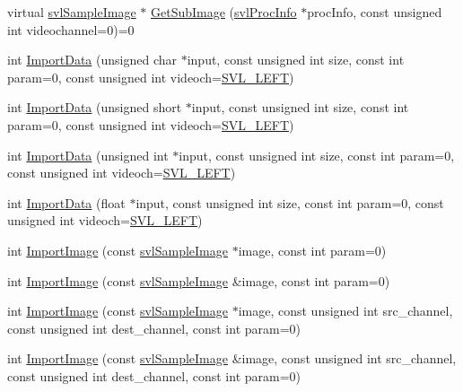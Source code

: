 \begin{DoxyCompactItemize}
\item 
virtual \hyperlink{classsvl_sample_image}{svl\-Sample\-Image} $\ast$ \hyperlink{classsvl_sample_image_a034171461bca11c13606f03abbf526a3}{Get\-Sub\-Image} (\hyperlink{structsvl_proc_info}{svl\-Proc\-Info} $\ast$proc\-Info, const unsigned int videochannel=0)=0
\item 
int \hyperlink{classsvl_sample_image_aef0e73b0e5906d4b60e689f41ff49a48}{Import\-Data} (unsigned char $\ast$input, const unsigned int size, const int param=0, const unsigned int videoch=\hyperlink{svl_definitions_8h_ab9fec7615f19c8df2919eebcab0b187f}{S\-V\-L\-\_\-\-L\-E\-F\-T})
\item 
int \hyperlink{classsvl_sample_image_a11b13d1f63e3a8581a84c848a83e8f85}{Import\-Data} (unsigned short $\ast$input, const unsigned int size, const int param=0, const unsigned int videoch=\hyperlink{svl_definitions_8h_ab9fec7615f19c8df2919eebcab0b187f}{S\-V\-L\-\_\-\-L\-E\-F\-T})
\item 
int \hyperlink{classsvl_sample_image_a92d332b2a5d130f19a4fc4aae9fc181c}{Import\-Data} (unsigned int $\ast$input, const unsigned int size, const int param=0, const unsigned int videoch=\hyperlink{svl_definitions_8h_ab9fec7615f19c8df2919eebcab0b187f}{S\-V\-L\-\_\-\-L\-E\-F\-T})
\item 
int \hyperlink{classsvl_sample_image_a6a64f4d94e9af374c72f94fa6b722ebd}{Import\-Data} (float $\ast$input, const unsigned int size, const int param=0, const unsigned int videoch=\hyperlink{svl_definitions_8h_ab9fec7615f19c8df2919eebcab0b187f}{S\-V\-L\-\_\-\-L\-E\-F\-T})
\item 
int \hyperlink{classsvl_sample_image_a762e6af7ff5258f2be32303ef0127b80}{Import\-Image} (const \hyperlink{classsvl_sample_image}{svl\-Sample\-Image} $\ast$image, const int param=0)
\item 
int \hyperlink{classsvl_sample_image_a714d30ac5f7c020e27a9e227748e1422}{Import\-Image} (const \hyperlink{classsvl_sample_image}{svl\-Sample\-Image} \&image, const int param=0)
\item 
int \hyperlink{classsvl_sample_image_a15dddfe94cc94595368e31e827bda277}{Import\-Image} (const \hyperlink{classsvl_sample_image}{svl\-Sample\-Image} $\ast$image, const unsigned int src\-\_\-channel, const unsigned int dest\-\_\-channel, const int param=0)
\item 
int \hyperlink{classsvl_sample_image_a06d3e066bf3e6e6f1e0dcb650c4e48e1}{Import\-Image} (const \hyperlink{classsvl_sample_image}{svl\-Sample\-Image} \&image, const unsigned int src\-\_\-channel, const unsigned int dest\-\_\-channel, const int param=0)

\end{DoxyCompactItemize}
